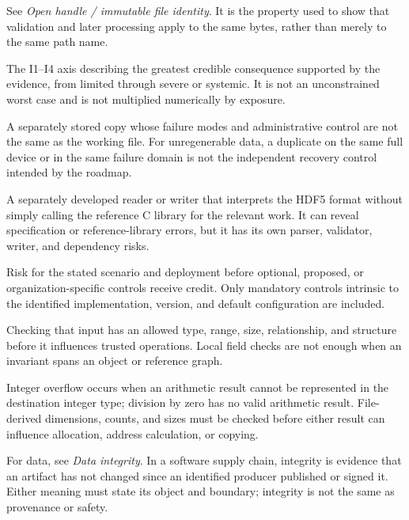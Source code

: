 \documentclass[../main.tex]{subfiles}
\begin{document}
\begin{description}[leftmargin=1.5em,style=nextline]

\item[Immutable file identity.]
See \emph{Open handle / immutable file identity}. It is the property used to
show that validation and later processing apply to the same bytes, rather than
merely to the same path name.

\item[Impact.]
The I1--I4 axis describing the greatest credible consequence supported by the
evidence, from limited through severe or systemic. It is not an unconstrained
worst case and is not multiplied numerically by exposure.

\item[Independent copy.]
A separately stored copy whose failure modes and administrative control are not
the same as the working file. For unregenerable data, a duplicate on the same
full device or in the same failure domain is not the independent recovery
control intended by the roadmap.

\item[Independent implementation.]
A separately developed reader or writer that interprets the HDF5 format
without simply calling the reference C library for the relevant work. It can
reveal specification or reference-library errors, but it has its own parser,
validator, writer, and dependency risks.

\item[Inherent risk.]
Risk for the stated scenario and deployment before optional, proposed, or
organization-specific controls receive credit. Only mandatory controls
intrinsic to the identified implementation, version, and default configuration
are included.

\item[Input validation.]
Checking that input has an allowed type, range, size, relationship, and
structure before it influences trusted operations. Local field checks are not
enough when an invariant spans an object or reference graph.

\item[Integer overflow / divide by zero.]
Integer overflow occurs when an arithmetic result cannot be represented in the
destination integer type; division by zero has no valid arithmetic result.
File-derived dimensions, counts, and sizes must be checked before either result
can influence allocation, address calculation, or copying.

\item[Integrity.]
For data, see \emph{Data integrity}. In a software supply chain, integrity is
evidence that an artifact has not changed since an identified producer
published or signed it. Either meaning must state its object and boundary;
integrity is not the same as provenance or safety.


\end{description}
\end{document}
